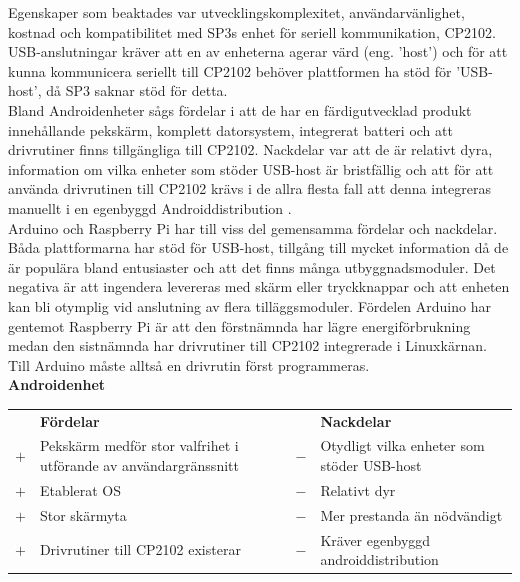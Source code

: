 \documentclass{article}
\begin{document}
            \noindent Egenskaper som beaktades var utvecklingskomplexitet, användarvänlighet, kostnad och kompatibilitet med SP3s enhet för seriell kommunikation, CP2102. USB-anslutningar kräver att en av enheterna agerar värd (eng. 'host') och för att kunna kommunicera seriellt till CP2102 behöver plattformen ha stöd för 'USB-host', då SP3 saknar stöd för detta. \\
            
            \noindent Bland Androidenheter sågs fördelar i att de har en färdigutvecklad produkt innehållande pekskärm, komplett datorsystem, integrerat batteri och att drivrutiner finns tillgängliga till CP2102. Nackdelar var att de är relativt dyra, information om vilka enheter som stöder USB-host är bristfällig och att för att använda drivrutinen till CP2102 krävs i de allra flesta fall att denna integreras manuellt i en egenbyggd Androiddistribution \cite{SL_AN809}. \\
            
            \noindent Arduino och Raspberry Pi har till viss del gemensamma fördelar och nackdelar. Båda plattformarna har stöd för USB-host, tillgång till mycket information då de är populära bland entusiaster och att det finns många utbyggnadsmoduler. Det negativa är att ingendera levereras med skärm eller tryckknappar och att enheten kan bli otymplig vid anslutning av flera tilläggsmoduler. Fördelen Arduino har gentemot Raspberry Pi är att den förstnämnda har lägre energiförbrukning medan den sistnämnda har drivrutiner till CP2102 integrerade i Linuxkärnan. Till Arduino måste alltså en drivrutin först programmeras. \\


            \noindent\textsf{\textbf{Androidenhet}}\\
            \begin{tabularx}{\textwidth}{@{}cXcX}
                & \textbf{Fördelar}     & & \textbf{Nackdelar} \\
                $+$ & Pekskärm medför stor valfrihet i utförande av användargränssnitt     &                            $-$ & Otydligt vilka enheter som
                                                  stöder USB-host \\
                $+$ &  Etablerat OS     &   $-$ & Relativt dyr \\
                $+$ &  Stor skärmyta    &   $-$ & Mer prestanda än nödvändigt \\
                $+$ &  Drivrutiner till CP2102 existerar &
                                            $-$ & Kräver egenbyggd androiddistribution \\
            \end{tabularx}\\
\end{document}
